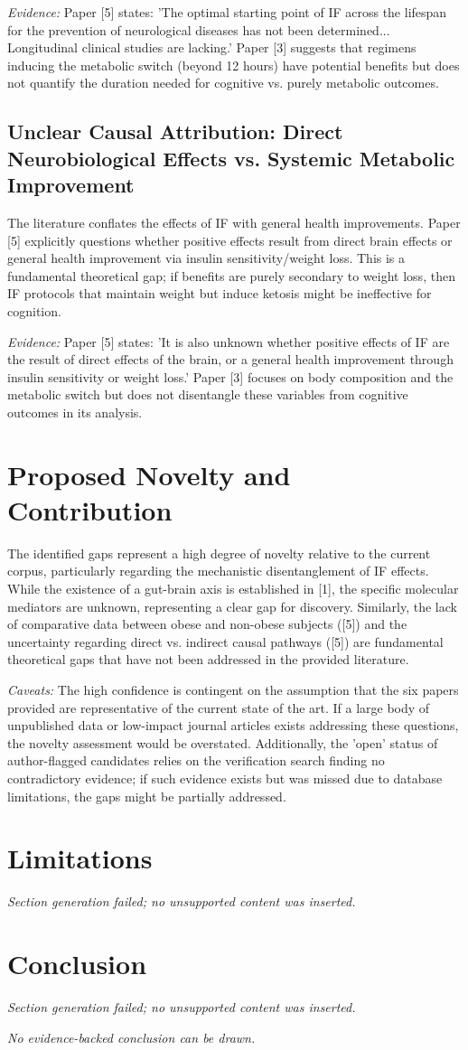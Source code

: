 \documentclass[11pt]{article}
\begin{document}
\textit{Evidence:} Paper [5] states: 'The optimal starting point of IF across the lifespan for the prevention of neurological diseases has not been determined... Longitudinal clinical studies are lacking.' Paper [3] suggests that regimens inducing the metabolic switch (beyond 12 hours) have potential benefits but does not quantify the duration needed for cognitive vs. purely metabolic outcomes.

\subsection{Unclear Causal Attribution: Direct Neurobiological Effects vs. Systemic Metabolic Improvement}
The literature conflates the effects of IF with general health improvements. Paper [5] explicitly questions whether positive effects result from direct brain effects or general health improvement via insulin sensitivity/weight loss. This is a fundamental theoretical gap; if benefits are purely secondary to weight loss, then IF protocols that maintain weight but induce ketosis might be ineffective for cognition.

\textit{Evidence:} Paper [5] states: 'It is also unknown whether positive effects of IF are the result of direct effects of the brain, or a general health improvement through insulin sensitivity or weight loss.' Paper [3] focuses on body composition and the metabolic switch but does not disentangle these variables from cognitive outcomes in its analysis.

\section{Proposed Novelty and Contribution}
The identified gaps represent a high degree of novelty relative to the current corpus, particularly regarding the mechanistic disentanglement of IF effects. While the existence of a gut-brain axis is established in [1], the specific molecular mediators are unknown, representing a clear gap for discovery. Similarly, the lack of comparative data between obese and non-obese subjects ([5]) and the uncertainty regarding direct vs. indirect causal pathways ([5]) are fundamental theoretical gaps that have not been addressed in the provided literature.

\textit{Caveats:} The high confidence is contingent on the assumption that the six papers provided are representative of the current state of the art. If a large body of unpublished data or low-impact journal articles exists addressing these questions, the novelty assessment would be overstated. Additionally, the 'open' status of author-flagged candidates relies on the verification search finding no contradictory evidence; if such evidence exists but was missed due to database limitations, the gaps might be partially addressed.

\section{Limitations}
\textit{Section generation failed; no unsupported content was inserted.}

\section{Conclusion}
\textit{Section generation failed; no unsupported content was inserted.}

\textit{No evidence-backed conclusion can be drawn.}
\end{document}

